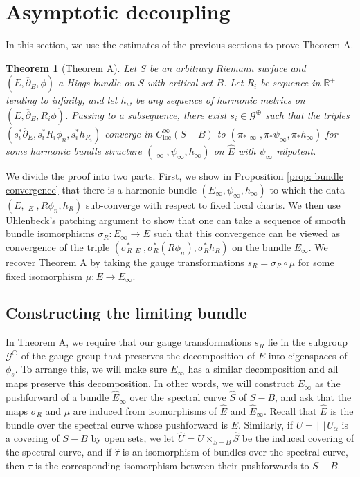 \documentclass[10pt]{amsart}
\newcommand{\R}{\mathbb R}
\DeclareMathOperator{\dbar}{\overline{\partial}}
\newtheorem{thm}{Theorem}[section]
\theoremstyle{definition}
\begin{document}
\section{Asymptotic decoupling}
In this section, we use the estimates of the previous sections to prove Theorem A.

\begin{thm}[Theorem A]
Let $S$ be an arbitrary Riemann surface and  $(E,\overline{\partial}_E,\phi)$ a Higgs bundle on $S$ with critical set $B$. Let $R_i$ be sequence in $\R^+$ tending to infinity, and let $h_i$, be any sequence of harmonic metrics on $(E,\overline{\partial}_E,R_i\phi)$. 
Passing to a subsequence, there exist $s_i \in \mathcal{G}^\oplus$ such that the triples $(s_i^*\overline{\partial}_E,  s_i^* R_i \phi_n, s_i^* h_{R_i})$ converge in $C^\infty_{\mathrm{loc}}(S - B)$ to $(\pi_*\dbar_\infty, \pi_*\psi_\infty, \pi_* h_\infty)$ for some harmonic bundle structure $(\dbar_\infty, \psi_\infty, h_\infty)$ on $\hat{E}$ with $\psi_\infty$ nilpotent. 
\end{thm}


We divide the proof into two parts. First, we show in Proposition \ref{prop: bundle convergence} that there is a harmonic bundle $(E_\infty, \psi_\infty, h_\infty)$ to which the data $(E, \dbar_E, R\phi_n, h_R)$ sub-converge with respect to fixed local charts. We then use Uhlenbeck's patching argument to show that one can take a sequence of smooth bundle isomorphisms $\sigma_R: E_\infty \to E$ such that this convergence can be viewed as convergence of the triple $(\sigma_R^*\dbar_E, \sigma_R^* (R \phi_n), \sigma_R^* h_R)$ on the bundle $E_\infty$. We recover Theorem A by taking the gauge transformations $s_R = \sigma_R\circ \mu$ for some fixed isomorphism $\mu: E \to E_\infty$.

\subsection{Constructing the limiting bundle}

In Theorem A, we require that our gauge transformations $s_R$ lie in the subgroup $\mathcal{G}^{\oplus}$ of the gauge group that preserves the decomposition of $E$ into eigenspaces of $\phi_s$. To arrange this, we will make sure $E_\infty$ has a similar decomposition and all maps preserve this decomposition. In other words, we will construct $E_\infty$ as the pushforward of a bundle $\hat{E}_\infty$ over the spectral curve $\hat{S}$ of $S - B$, and ask that the maps $\sigma_R$ and $\mu$ are induced from isomorphisms of $\hat{E}$ and $\hat{E}_\infty$. Recall that $\hat{E}$ is the bundle over the spectral curve whose pushforward is $E$. Similarly, if $U = \bigsqcup U_\alpha$ is a covering of $S - B$ by open sets, we let $\hat{U} = U \times_{S - B} \hat{S}$ be the induced covering of the spectral curve, and if $\hat{\tau}$ is an isomorphism of bundles over the spectral curve, then $\tau$ is the corresponding isomorphism between their pushforwards to $S-B$.
\end{document}
